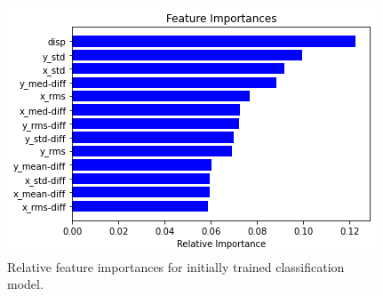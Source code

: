 \begin{figure}[h]
    \centering
    \includegraphics[width=\textwidth]{Images/Models/FI_RandomForestV1.png}
    \caption{Relative feature importances for initially trained classification model.}
    \label{fig:FI_RandomForestV1}
\end{figure}

